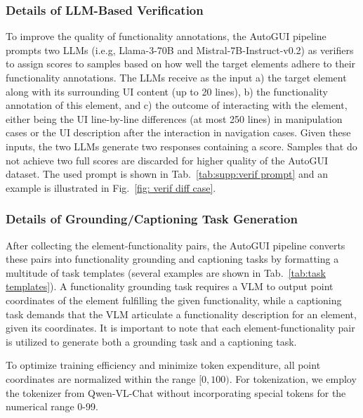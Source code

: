 \subsubsection{Details of LLM-Based Verification}
\label{suc:supp:verif details}
To improve the quality of functionality annotations, the AutoGUI pipeline prompts two LLMs (i.e.g, Llama-3-70B and Mistral-7B-Instruct-v0.2) as verifiers to assign scores to samples based on how well the target elements adhere to their functionality annotations. The LLMs receive as the input a) the target element along with its surrounding UI content (up to 20 lines), b) the functionality annotation of this element, and c) the outcome of interacting with the element, either being the UI line-by-line differences (at most 250 lines) in manipulation cases or the UI description after the interaction in navigation cases. Given these inputs, the two LLMs generate two responses containing a score. Samples that do not achieve two full scores are discarded for higher quality of the AutoGUI dataset. The used prompt is shown in Tab.~\ref{tab:supp:verif prompt} and an example is illustrated in Fig.~\ref{fig: verif diff case}.








\subsubsection{Details of Grounding/Captioning Task Generation}

After collecting the element-functionality pairs, the AutoGUI pipeline converts these pairs into functionality grounding and captioning tasks by formatting a multitude of task templates (several examples are shown in Tab.~\ref{tab:task templates}). A functionality grounding task requires a VLM to output point coordinates of the element fulfilling the given functionality, while a captioning task demands that the VLM articulate a functionality description for an element, given its coordinates. It is important to note that each element-functionality pair is utilized to generate both a grounding task and a captioning task.

To optimize training efficiency and minimize token expenditure, all point coordinates are normalized within the range $[0,100)$. For tokenization, we employ the tokenizer from Qwen-VL-Chat without incorporating special tokens for the numerical range 0-99.


